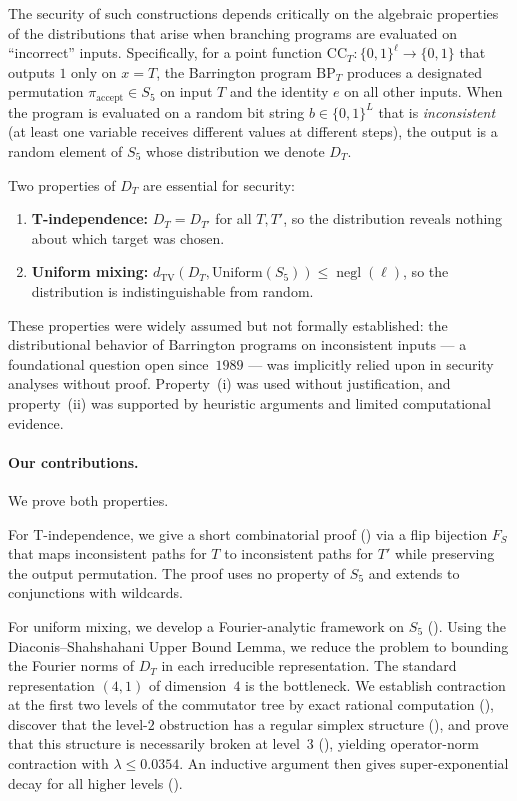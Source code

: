 \documentclass[version=submission]{iacrcc}
\DeclareMathOperator{\negl}{negl}
\newcommand{\dtv}{d_{\mathrm{TV}}}
\newcommand{\CC}{\mathrm{CC}}
\newcommand{\BP}{\mathrm{BP}}
\begin{document}
The security of such constructions depends critically on the algebraic properties
of the distributions that arise when branching programs are evaluated on
``incorrect'' inputs. Specifically, for a point function $\CC_T : \{0,1\}^\ell
\to \{0,1\}$ that outputs $1$ only on $x = T$, the Barrington program $\BP_T$
produces a designated permutation $\pi_{\mathrm{accept}} \in S_5$ on input $T$
and the identity $e$ on all other inputs. When the program is evaluated on a
random bit string $b \in \{0,1\}^L$ that is \emph{inconsistent} (at least one
variable receives different values at different steps), the output is a random
element of $S_5$ whose distribution we denote $D_T$.

Two properties of $D_T$ are essential for security:

\begin{enumerate}[label=(\roman*)]
\item \textbf{T-independence:} $D_T = D_{T'}$ for all $T, T'$, so the
  distribution reveals nothing about which target was chosen.
\item \textbf{Uniform mixing:} $\dtv(D_T, \mathrm{Uniform}(S_5)) \leq \negl(\ell)$,
  so the distribution is indistinguishable from random.
\end{enumerate}

These properties were widely assumed but not formally established:
the distributional behavior of Barrington programs on inconsistent inputs
--- a foundational question open since~$1989$ --- was implicitly relied upon
in security analyses without proof.
Property~(i) was used without justification, and property~(ii)
was supported by heuristic arguments and limited computational evidence.

\paragraph{Our contributions.}
We prove both properties.

For T-independence, we give a short combinatorial proof ()
via a flip bijection $F_S$ that maps inconsistent paths for $T$ to
inconsistent paths for $T'$ while preserving the output permutation. The proof
uses no property of $S_5$ and extends to conjunctions with wildcards.

For uniform mixing, we develop a Fourier-analytic framework on $S_5$
(). Using the Diaconis--Shahshahani Upper Bound
Lemma, we reduce the problem to bounding the Fourier norms of $D_T$ in
each irreducible representation. The standard representation $(4,1)$ of
dimension~$4$ is the bottleneck. We establish contraction at the first
two levels of the commutator tree by exact rational computation
(), discover that the level-$2$ obstruction
has a regular simplex structure (), and prove that this
structure is necessarily broken at level~$3$ (), yielding
operator-norm contraction with $\lambda \leq 0.0354$. An inductive argument
then gives super-exponential decay for all higher levels ().
\end{document}
